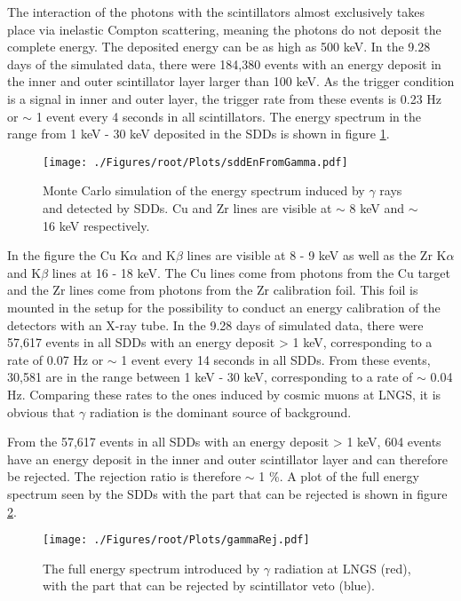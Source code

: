The interaction of the photons with the scintillators almost exclusively takes place via inelastic Compton scattering, meaning the photons do not deposit the complete energy. The deposited energy can be as high as 500 keV. In the 9.28 days of the simulated data, there were 184,380 events with an energy deposit in the inner and outer scintillator layer larger than 100 keV. As the trigger condition is a signal in inner and outer layer, the trigger rate from these events is 0.23 Hz or $\sim$ 1 event every 4 seconds in all scintillators. The energy spectrum in the range from 1 keV - 30 keV deposited in the SDDs is shown in figure \ref{fig:sddEnDepGamma}.
\begin{figure}[h]
 \centering
 \texttt{[image: ./Figures/root/Plots/sddEnFromGamma.pdf]}
 \caption{Monte Carlo simulation of the energy spectrum induced by $\gamma$ rays and detected by SDDs. Cu and Zr lines are visible at $\sim$ 8 keV and $\sim$ 16 keV respectively.}
 \label{fig:sddEnDepGamma}
\end{figure}
In the figure the Cu K$\alpha$ and K$\beta$ lines are visible at 8 - 9 keV as well as the Zr K$\alpha$ and K$\beta$ lines at 16 - 18 keV. The Cu lines come from photons from the Cu target and the Zr lines come from photons from the Zr calibration foil. This foil is mounted in the setup for the possibility to conduct an energy calibration of the detectors with an X-ray tube. In the 9.28 days of simulated data, there were 57,617 events in all SDDs with an energy deposit > 1 keV, corresponding to a rate of 0.07 Hz or $\sim$ 1 event every 14 seconds in all SDDs. From these events, 30,581 are in the range between 1 keV - 30 keV, corresponding to a rate of $\sim$ 0.04 Hz. Comparing these rates to the ones induced by cosmic muons at LNGS, it is obvious that $\gamma$ radiation is the dominant source of background.

From the 57,617 events in all SDDs with an energy deposit > 1 keV, 604 events have an energy deposit in the inner and outer scintillator layer and can therefore be rejected. The rejection ratio is therefore $\sim$ 1 \%. A plot of the full energy spectrum seen by the SDDs with the part that can be rejected is shown in figure \ref{fig:gammaRej}.
\begin{figure}[h]
 \centering
 \texttt{[image: ./Figures/root/Plots/gammaRej.pdf]}
 \caption{The full energy spectrum introduced by $\gamma$ radiation at LNGS (red), with the part that can be rejected by scintillator veto (blue).}
 \label{fig:gammaRej}
\end{figure}





